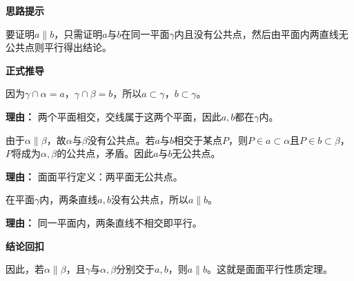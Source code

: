 \begin{proofbox}
	\textbf{\textcolor{CProof}{思路提示}}

	要证明$a\parallel b$，只需证明$a$与$b$在同一平面$\gamma$内且没有公共点，然后由平面内两直线无公共点则平行得出结论。

	\medskip
	\textbf{\textcolor{CProof}{正式推导}}
	\begin{description}[style=nextline, leftmargin=2.8em, labelsep=0.5em, itemsep=0.55em]
		\item[\textbf{步骤一（共面判定）：}] 因为$\gamma\cap\alpha=a$，$\gamma\cap\beta=b$，所以$a\subset\gamma$，$b\subset\gamma$。
			\par\textbf{理由：} 两个平面相交，交线属于这两个平面，因此$a,b$都在$\gamma$内。

		\item[\textbf{步骤二（无公共点证明）：}] 由于$\alpha\parallel\beta$，故$\alpha$与$\beta$没有公共点。若$a$与$b$相交于某点$P$，则$P\in a\subset\alpha$且$P\in b\subset\beta$，$P$将成为$\alpha,\beta$的公共点，矛盾。因此$a$与$b$无公共点。
			\par\textbf{理由：} 面面平行定义：两平面无公共点。

		\item[\textbf{步骤三（平行结论）：}] 在平面$\gamma$内，两条直线$a,b$没有公共点，所以$a\parallel b$。
			\par\textbf{理由：} 同一平面内，两条直线不相交即平行。
	\end{description}

	\medskip
	\textbf{\textcolor{CProof}{结论回扣}}

	因此，若$\alpha\parallel\beta$，且$\gamma$与$\alpha,\beta$分别交于$a,b$，则$a\parallel b$。这就是面面平行性质定理。
\end{proofbox}
